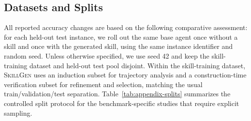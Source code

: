 \documentclass{article}
\begin{document}
\subsection{Datasets and Splits}
\label{app:datasets-splits}

All reported accuracy changes are based on the following comparative assessment: for each held-out test instance, we roll out the same base agent once without a skill and once with the generated skill, using the same instance identifier and random seed. Unless otherwise specified, we use seed 42 and keep the skill-training dataset and held-out test pool disjoint. Within the skill-training dataset, \textsc{SkillGen} uses an induction subset for trajectory analysis and a construction-time verification subset for refinement and selection, matching the usual train/validation/test separation. Table~\ref{tab:appendix-splits} summarizes the controlled split protocol for the benchmark-specific studies that require explicit sampling.
\end{document}
